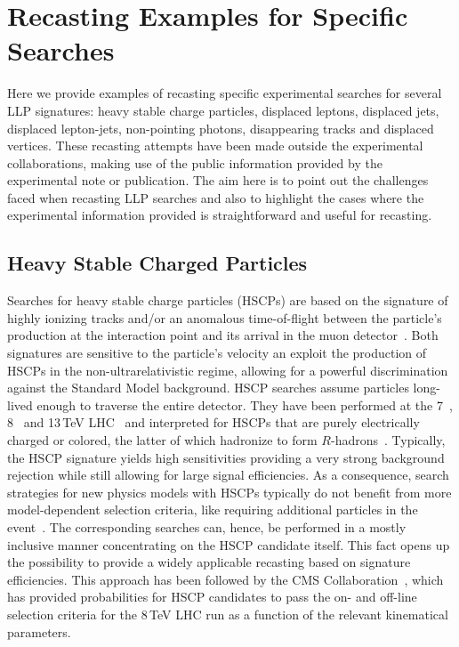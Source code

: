 \section{Recasting Examples for Specific Searches}
\label{sec:ch5-recastExamples}

Here we provide examples of recasting specific experimental
searches for several LLP signatures: heavy stable charge particles, displaced
leptons, displaced jets, displaced lepton-jets, non-pointing photons, disappearing tracks and displaced vertices.
These recasting attempts have been made outside the experimental collaborations,
making use of the public information provided by the experimental note or
publication. The aim here is to point out the challenges faced when recasting
LLP searches and also to highlight the cases where the
experimental information provided is straightforward and useful for
recasting.

\subsection{Heavy Stable Charged Particles}
\label{sec:ch5-HSCPs}

\renewcommand{\vec}[1]{\boldsymbol{#1}}
%

Searches for heavy stable charge particles (HSCPs) are based on the signature
of highly ionizing tracks
and/or an anomalous time-of-flight between the particle's production at the interaction point and its arrival in the
muon detector~\cite{Fairbairn:2006gg}.
Both signatures are sensitive to the particle's velocity an exploit the
production of HSCPs in the non-ultrarelativistic regime,
allowing for a powerful discrimination against the Standard Model background.
HSCP searches assume particles long-lived enough to traverse
the entire detector.
They have been performed at the 7~\cite{Chatrchyan:2012sp,Aad:2012pra},
8~\cite{Chatrchyan:2013oca,ATLAS:2014fka} and 13\,TeV
LHC~\cite{Aaboud:2016dgf,CMS-PAS-EXO-16-036} and interpreted for HSCPs that are
purely electrically charged or colored, the latter of which hadronize to form
$R$-hadrons~\cite{Farrar:1978xj}.
Typically, the HSCP signature yields high sensitivities providing 
a very strong background rejection while still allowing for large 
signal efficiencies. 
As a consequence, search strategies for new physics models with HSCPs
typically do not benefit from more model-dependent selection criteria, like requiring additional 
particles in the event~\cite{Heisig:2012zq}. The corresponding searches can, hence, be
performed in a mostly inclusive manner concentrating on the HSCP candidate itself.
This fact opens up the possibility to provide a widely applicable recasting based on signature
efficiencies. This approach has been followed by the CMS
Collaboration~\cite{Khachatryan:2015lla},
which has provided probabilities for HSCP candidates to pass the on- and
off-line selection criteria for the 8\,TeV LHC run as a function of the relevant kinematical parameters.


